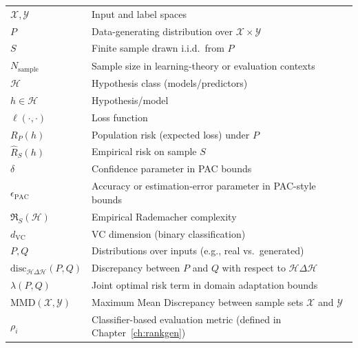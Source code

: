 \begin{tabularx}{\textwidth}{@{}L X@{}}
$\mathcal{X},\mathcal{Y}$ & Input and label spaces \\
$P$ & Data-generating distribution over $\mathcal{X}\times\mathcal{Y}$ \\
$S$ & Finite sample drawn i.i.d.\ from $P$ \\
$N_{\mathrm{sample}}$ & Sample size in learning-theory or evaluation contexts \\
$\mathcal{H}$ & Hypothesis class (models/predictors) \\
$h\in\mathcal{H}$ & Hypothesis/model \\
$\ell(\cdot,\cdot)$ & Loss function \\
$R_P(h)$ & Population risk (expected loss) under $P$ \\
$\widehat{R}_S(h)$ & Empirical risk on sample $S$ \\
$\delta$ & Confidence parameter in PAC bounds \\
$\epsilon_{\mathrm{PAC}}$ & Accuracy or estimation-error parameter in PAC-style bounds \\
$\mathfrak{R}_S(\mathcal{H})$ & Empirical Rademacher complexity \\
$d_{\mathrm{VC}}$ & VC dimension (binary classification) \\
$P,Q$ & Distributions over inputs (e.g., real vs.\ generated) \\
$\mathrm{disc}_{\mathcal{H}\Delta\mathcal{H}}(P,Q)$ & Discrepancy between $P$ and $Q$ with respect to $\mathcal{H}\Delta\mathcal{H}$ \\
$\lambda(P,Q)$ & Joint optimal risk term in domain adaptation bounds \\
$\mathrm{MMD}(\mathcal{X},\mathcal{Y})$ & Maximum Mean Discrepancy between sample sets $\mathcal{X}$ and $\mathcal{Y}$ \\
$\rho_i$ & Classifier-based evaluation metric (defined in Chapter~\ref{ch:rankgen}) \\


\end{tabularx}
